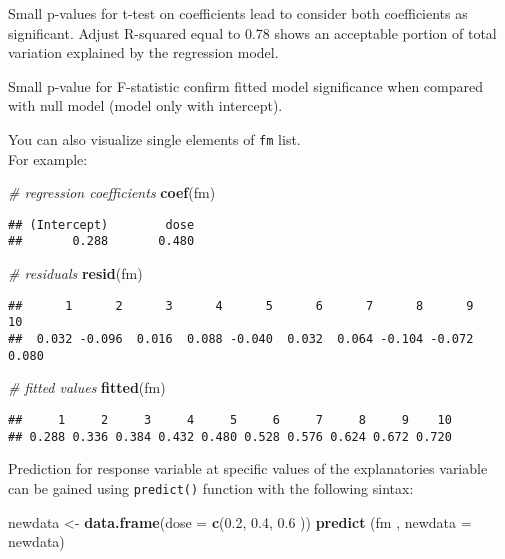 \documentclass[]{book}
\newenvironment{Shaded}{\begin{snugshade}}{\end{snugshade}}
\newcommand{\KeywordTok}[1]{\textcolor[rgb]{0.13,0.29,0.53}{\textbf{{#1}}}}
\newcommand{\DataTypeTok}[1]{\textcolor[rgb]{0.13,0.29,0.53}{{#1}}}
\newcommand{\FloatTok}[1]{\textcolor[rgb]{0.00,0.00,0.81}{{#1}}}
\newcommand{\StringTok}[1]{\textcolor[rgb]{0.31,0.60,0.02}{{#1}}}
\newcommand{\CommentTok}[1]{\textcolor[rgb]{0.56,0.35,0.01}{\textit{{#1}}}}
\newcommand{\NormalTok}[1]{{#1}}
\begin{document}
Small p-values for t-test on coefficients lead to consider both
coefficients as significant. Adjust R-squared equal to 0.78 shows an
acceptable portion of total variation explained by the regression model.

Small p-value for F-statistic confirm fitted model significance when
compared with null model (model only with intercept).

You can also visualize single elements of \texttt{fm} list.\\
For example:

\begin{Shaded}
\begin{Highlighting}[]
\CommentTok{# regression coefficients}
\KeywordTok{coef}\NormalTok{(fm)}
\end{Highlighting}
\end{Shaded}

\begin{verbatim}
## (Intercept)        dose 
##       0.288       0.480
\end{verbatim}

\begin{Shaded}
\begin{Highlighting}[]
\CommentTok{# residuals}
\KeywordTok{resid}\NormalTok{(fm)}
\end{Highlighting}
\end{Shaded}

\begin{verbatim}
##      1      2      3      4      5      6      7      8      9     10 
##  0.032 -0.096  0.016  0.088 -0.040  0.032  0.064 -0.104 -0.072  0.080
\end{verbatim}

\begin{Shaded}
\begin{Highlighting}[]
\CommentTok{# fitted values}
\KeywordTok{fitted}\NormalTok{(fm)}
\end{Highlighting}
\end{Shaded}

\begin{verbatim}
##     1     2     3     4     5     6     7     8     9    10 
## 0.288 0.336 0.384 0.432 0.480 0.528 0.576 0.624 0.672 0.720
\end{verbatim}

Prediction for response variable at specific values of the explanatories
variable can be gained using \texttt{predict()} function with the
following sintax:

\begin{Shaded}
\begin{Highlighting}[]
\NormalTok{newdata <-}\StringTok{ }\KeywordTok{data.frame}\NormalTok{(}\DataTypeTok{dose =} \KeywordTok{c}\NormalTok{(}\FloatTok{0.2}\NormalTok{, }\FloatTok{0.4}\NormalTok{, }\FloatTok{0.6} \NormalTok{))}
\KeywordTok{predict} \NormalTok{(fm , }\DataTypeTok{newdata =} \NormalTok{newdata)}
\end{Highlighting}
\end{Shaded}
\end{document}
